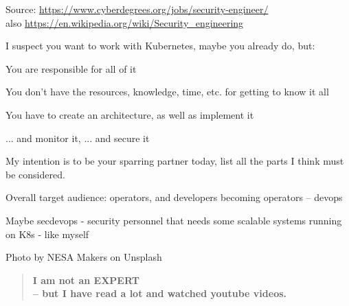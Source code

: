 \documentclass[Screen16to9,17pt]{foils}
\begin{document}
Source: \url{https://www.cyberdegrees.org/jobs/security-engineer/}\\
also
\url{https://en.wikipedia.org/wiki/Security_engineering}





I suspect you want to work with Kubernetes, maybe you already do, but:
\begin{list2}
\item You are responsible for all of it
\item You don't have the resources, knowledge, time, etc. for getting to know it all
\item You have to create an architecture, as well as implement it
\item ... and monitor it, ... and secure it
\end{list2}
My intention is to be your sparring partner today, list all the parts I think must be considered.



\begin{quote}

\end{quote}

\begin{list2}
\item Overall target audience: operators, and developers becoming operators -- devops
\item Maybe secdevops - security personnel that needs some scalable systems running on K8s
    - like myself
\end{list2}
\hfill {\small Photo by NESA Makers on Unsplash}


\begin{quote}
\large \bf I am not an EXPERT \\
-- but I have read a lot and watched youtube videos. \smiley
\end{quote}
\end{document}
